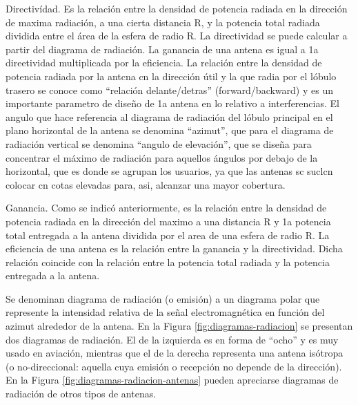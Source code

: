 Directivídad. Es la relación entre la densidad de potencia radiada en la dirección de maxima radiación, a una cierta distancia R, y la potencia total radiada dividida entre el área de la esfera de radio R.
La directividad se puede calcular a partir del diagrama de radiación. La ganancia de una antena es igual a 1a direetividad multiplicada por la eﬁciencia. La relación entre la densidad de potencia radiada por la antcna cn la dirección útil y la que radia por el lóbulo trasero se conoce como “relación delante/detras” (forward/backward) y es un importante parametro de diseño de 1a antena en lo relativo a interferencias. El angulo que hace referencia al diagrama de radiación del lóbulo principal en el plano horizontal de la antena se denomina “azimut”, que para el diagrama de radiación vertical se denomina “angulo de elevación”, que se diseña para concentrar el máximo de radiación para aquellos ángulos por debajo de la horizontal, que es donde se agrupan los usuarios, ya que las antenas sc suclcn colocar cn cotas elevadas para, asi, alcanzar una mayor cobertura.

Ganancia. Como se indicó anteriormente, es la relación entre la densidad de potencia radiada en la dirección del maximo a una distancia R y 1a potencia total entregada a la antena dividida por el area de una esfera de radio R. La eﬁciencia de una antena es la relación entre la ganancia y la directividad. Dicha relación coincide con la relación entre la potencia total radiada y la potencia entregada a la antena.










 Se denominan diagrama de radiaci\'on (o
  emisi\'on) a un diagrama polar que represente la intensidad relativa
  de la se\~nal electromagn\'etica en funci\'on del azimut alrededor
  de la antena.  En la Figura \ref{fig:diagramas-radiacion} se
  presentan dos diagramas de radiaci\'on. El de la izquierda es en
  forma de ``ocho'' y es muy usado en aviaci\'on, mientras que el de
  la derecha representa una antena is\'otropa (o no-direccional:
  aquella cuya emisi\'on o recepci\'on no depende de la direcci\'on).
En la Figura \ref{fig:diagramas-radiacion-antenas} pueden apreciarse diagramas de radiaci\'on 
de otros tipos de antenas.



